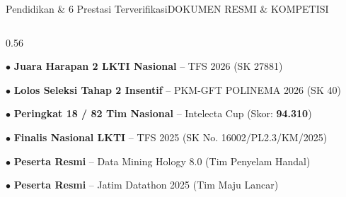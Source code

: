 \documentclass[aspectratio=169,11pt]{beamer}
\begin{document}
\begin{frame}{Pendidikan \& 6 Prestasi Terverifikasi}{DOKUMEN RESMI \& KOMPETISI}
\begin{columns}[t]
    \begin{column}{0.56\textwidth}
      \begin{tcolorbox}[colback=white,colframe=brandBorder,arc=2mm,boxrule=0.6pt,boxsep=2.5pt,top=3pt,bottom=3pt,title={\footnotesize \bfseries \color{brandNavy} 6 Rekam Jejak Prestasi \& Hibah Terverifikasi}]
        {\scriptsize \color{brandDark}
        $\bullet$ \textbf{\color{amberBadgeText}Juara Harapan 2 LKTI Nasional} -- TFS 2026 (SK 27881) \par \vspace{2pt}
        $\bullet$ \textbf{\color{blueBadgeText}Lolos Seleksi Tahap 2 Insentif} -- PKM-GFT POLINEMA 2026 (SK 40) \par \vspace{2pt}
        $\bullet$ \textbf{\color{brandNavy}Peringkat 18 / 82 Tim Nasional} -- Intelecta Cup (Skor: \textbf{94.310}) \par \vspace{2pt}
        $\bullet$ \textbf{\color{brandNavy}Finalis Nasional LKTI} -- TFS 2025 (SK No. 16002/PL2.3/KM/2025) \par \vspace{2pt}
        $\bullet$ \textbf{\color{brandNavy}Peserta Resmi} -- Data Mining Hology 8.0 (Tim Penyelam Handal) \par \vspace{2pt}
        $\bullet$ \textbf{\color{brandNavy}Peserta Resmi} -- Jatim Datathon 2025 (Tim Maju Lancar)
        }
      \end{tcolorbox}
    \end{column}
  \end{columns}
\end{frame}
\end{document}
